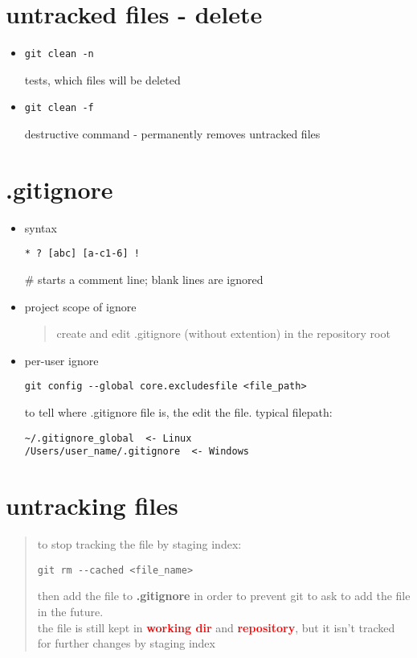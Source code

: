\documentclass{report}
\begin{document}
\section{untracked files - delete}
\begin{itemize}
\item \begin{verbatim}
git clean -n
\end{verbatim}
tests, which files will be deleted
\item \begin{verbatim}
git clean -f
\end{verbatim}
destructive command - permanently removes untracked files
\end{itemize}

\section{.gitignore}
\begin{itemize}
\item syntax
\begin{verbatim}
* ? [abc] [a-c1-6] !
\end{verbatim}
\# starts a comment line; blank lines are ignored

\item project scope of ignore
\begin{quote}
create and edit .gitignore (without extention) in the repository root
\end{quote}

\item per-user ignore
\begin{verbatim}
git config --global core.excludesfile <file_path>
\end{verbatim}
to tell where .gitignore file is, the edit the file. typical filepath:
\begin{verbatim}
~/.gitignore_global  <- Linux
/Users/user_name/.gitignore  <- Windows
\end{verbatim}
\end{itemize}

\section{untracking files}
\begin{quote}
to stop tracking the  file by staging index:
\begin{verbatim}
git rm --cached <file_name>
\end{verbatim}
then add the file to \textbf{.gitignore} in order to prevent git to ask to add the file in the future.\\
the file is still kept in \textcolor{red}{\textbf{working dir}} and \textcolor{red}{\textbf{repository}}, but it isn't tracked for further changes by staging index
\end{quote}
\end{document}
